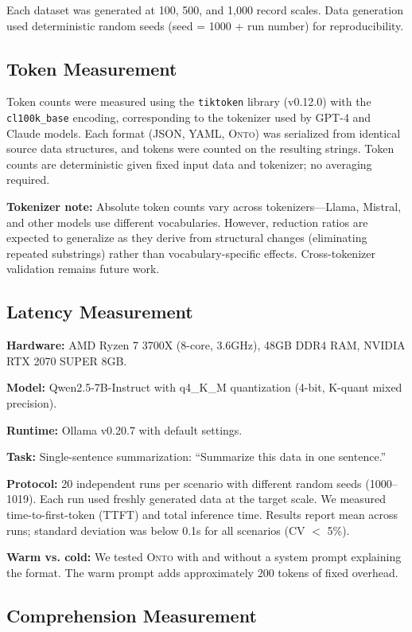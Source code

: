 \documentclass[10pt,twocolumn]{article}
\newcommand{\onto}{\textsc{Onto}\xspace}
\begin{document}
Each dataset was generated at 100, 500, and 1,000 record scales. Data generation used deterministic random seeds (seed = 1000 + run number) for reproducibility.

\subsection{Token Measurement}

Token counts were measured using the \texttt{tiktoken} library (v0.12.0) with the \texttt{cl100k\_base} encoding, corresponding to the tokenizer used by GPT-4 and Claude models. Each format (JSON, YAML, \onto) was serialized from identical source data structures, and tokens were counted on the resulting strings. Token counts are deterministic given fixed input data and tokenizer; no averaging required.

\textbf{Tokenizer note:} Absolute token counts vary across tokenizers---Llama, Mistral, and other models use different vocabularies. However, reduction ratios are expected to generalize as they derive from structural changes (eliminating repeated substrings) rather than vocabulary-specific effects. Cross-tokenizer validation remains future work.

\subsection{Latency Measurement}

\textbf{Hardware:} AMD Ryzen 7 3700X (8-core, 3.6GHz), 48GB DDR4 RAM, NVIDIA RTX 2070 SUPER 8GB.

\textbf{Model:} Qwen2.5-7B-Instruct with q4\_K\_M quantization (4-bit, K-quant mixed precision).

\textbf{Runtime:} Ollama v0.20.7 with default settings.

\textbf{Task:} Single-sentence summarization: ``Summarize this data in one sentence.''

\textbf{Protocol:} 20 independent runs per scenario with different random seeds (1000--1019). Each run used freshly generated data at the target scale. We measured time-to-first-token (TTFT) and total inference time. Results report mean across runs; standard deviation was below 0.1s for all scenarios (CV $<$ 5\%).

\textbf{Warm vs. cold:} We tested \onto with and without a system prompt explaining the format. The warm prompt adds approximately 200 tokens of fixed overhead.

\subsection{Comprehension Measurement}
\end{document}
